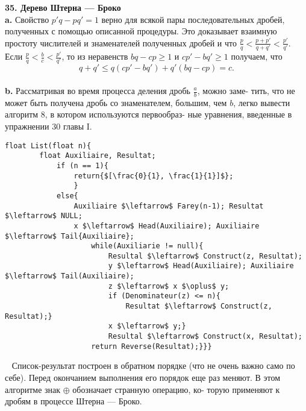 \pagebreak
\noindent\textbf{35. Дерево Штерна — Броко}\\

\textbf{a.}  Свойство $p'q - pq' = 1$ верно для всякой пары последовательных\linebreak
дробей, полученных с помощью описанной процедуры. Это доказывает\linebreak
взаимную простоту числителей и знаменателей полученных дробей и\linebreak
что $\frac{p}{q} < \frac{p + p'}{q + q'} < \frac{p'}{q'}$.\\

\hspace*{0pt}Если $\frac{p}{q} < \frac{b}{c} < \frac{p'}{q'}$, то из неравенств $bq - cp \geqslant 1$ и $cp' - bq' \geqslant 1$ получаем,\linebreak
что
$$q + q' \leqslant q(cp' - bq') + q'(bq - cp) = c.$$\\
\hspace*{15pt}\textbf{b.} Рассматривая во время процесса деления дробь $\frac{a}{b}$, можно заме­-\linebreak
тить, что не может быть получена дробь со знаменателем, большим,\linebreak
чем $b$,  легко вывести алгоритм 8, в котором используются первообраз-\linebreak
ные уравнения, введенные в упражнении 30 главы I.\\

\begin{lstlisting}[mathescape = true, caption = {Прохождение ряда Фарея}]
	float List(float n){
		float Auxiliaire, Resultat;
			if (n == 1){
				return{$[\frac{0}{1}, \frac{1}{1}]$};
				}
			else{
				Auxiliaire $\leftarrow$ Farey(n-1); Resultat $\leftarrow$ NULL;
				x $\leftarrow$ Head(Auxiliaire); Auxiliaire $\leftarrow$ Tail{Auxiliaire};
					while(Auxiliarie != null){
						Resultal $\leftarrow$ Construct(z, Resultat);
						у $\leftarrow$ Head(Auxiliaire); Auxiliaire $\leftarrow$ Tail(Auxiliaire);
						z $\leftarrow$ x $\oplus$ y;
						if (Denominateur(z) <= n){
							Resultat $\leftarrow$ Construct(z, Resultat);}
						x $\leftarrow$ y;}
						Resultal $\leftarrow$ Construct(x, Resultat);
					return Reverse(Resultat);}}}
			\end{lstlisting}
	\ \newline
\hspace*{15pt}Список-результат построен в обратном порядке (что не очень важно­\linebreak
само по себе). Перед окончанием выполнения его порядок еще раз\linebreak 
меняют. В этом алгоритме знак $\oplus$  обозначает странную операцию, ко-\linebreak
торую применяют к дробям в процессе Штерна — Броко.


